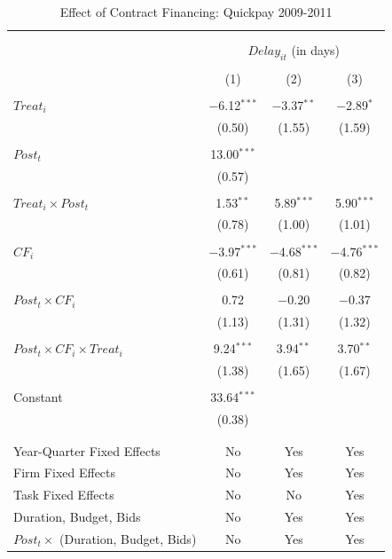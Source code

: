 \documentclass[
]{article}
\begin{document}
\begin{table}[H] \centering 
  \caption{Effect of Contract Financing: Quickpay 2009-2011} 
  \label{} 
\small 
\begin{tabular}{@{\extracolsep{-2pt}}lccc} 
\\[-1.8ex]\hline 
\hline \\[-1.8ex] 
\\[-1.8ex] & \multicolumn{3}{c}{$Delay_{it}$ (in days)} \\ 
\\[-1.8ex] & (1) & (2) & (3)\\ 
\hline \\[-1.8ex] 
 $Treat_i$ & $-$6.12$^{***}$ & $-$3.37$^{**}$ & $-$2.89$^{*}$ \\ 
  & (0.50) & (1.55) & (1.59) \\ 
  & & & \\ 
 $Post_t$ & 13.00$^{***}$ &  &  \\ 
  & (0.57) &  &  \\ 
  & & & \\ 
 $Treat_i \times Post_t$ & 1.53$^{**}$ & 5.89$^{***}$ & 5.90$^{***}$ \\ 
  & (0.78) & (1.00) & (1.01) \\ 
  & & & \\ 
 $CF_i$ & $-$3.97$^{***}$ & $-$4.68$^{***}$ & $-$4.76$^{***}$ \\ 
  & (0.61) & (0.81) & (0.82) \\ 
  & & & \\ 
 $Post_t \times CF_i$ & 0.72 & $-$0.20 & $-$0.37 \\ 
  & (1.13) & (1.31) & (1.32) \\ 
  & & & \\ 
 $Post_t \times CF_i \times Treat_i$ & 9.24$^{***}$ & 3.94$^{**}$ & 3.70$^{**}$ \\ 
  & (1.38) & (1.65) & (1.67) \\ 
  & & & \\ 
 Constant & 33.64$^{***}$ &  &  \\ 
  & (0.38) &  &  \\ 
  & & & \\ 
\hline \\[-1.8ex] 
Year-Quarter Fixed Effects & No & Yes & Yes \\ 
Firm Fixed Effects & No & Yes & Yes \\ 
Task Fixed Effects & No & No & Yes \\ 
Duration, Budget, Bids & No & Yes & Yes \\ 
$Post_t \times $  (Duration, Budget, Bids) & No & Yes & Yes \\ 

\end{tabular}
\end{table}
\end{document}
